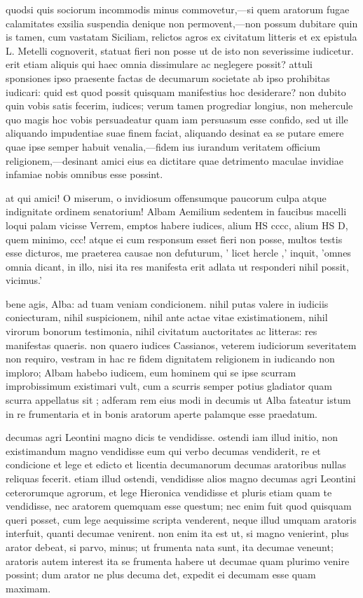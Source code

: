  quodsi quis sociorum incommodis minus commovetur,—si quem aratorum fugae calamitates exsilia suspendia denique non permovent,—non possum dubitare quin is tamen, cum vastatam Siciliam, relictos agros ex civitatum litteris et ex epistula L. Metelli cognoverit, statuat fieri non posse ut de isto non severissime iudicetur. erit etiam aliquis qui haec omnia dissimulare ac neglegere possit? attuli sponsiones ipso praesente factas de decumarum societate ab ipso prohibitas iudicari: quid est quod possit quisquam manifestius hoc desiderare? non dubito quin vobis satis fecerim, iudices; verum tamen progrediar longius, non mehercule quo magis hoc vobis persuadeatur quam iam persuasum esse confido, sed ut ille aliquando impudentiae suae finem faciat, aliquando desinat ea se putare emere quae ipse semper habuit venalia,—fidem ius iurandum veritatem officium religionem,—desinant amici eius ea dictitare quae detrimento maculae invidiae infamiae nobis omnibus esse possint.

 at qui amici! O miserum, o invidiosum offensumque paucorum culpa atque indignitate ordinem senatorium! Albam Aemilium sedentem in faucibus macelli loqui palam vicisse Verrem, emptos habere iudices, alium HS cccc, alium HS D, quem minimo, ccc! atque ei cum responsum esset fieri non posse, multos testis esse dicturos, me praeterea causae non defuturum, ' licet hercle ,' inquit, 'omnes omnia dicant, in illo, nisi ita res manifesta erit adlata ut responderi nihil possit, vicimus.'

 bene agis, Alba: ad tuam veniam condicionem. nihil putas valere in iudiciis coniecturam, nihil suspicionem, nihil ante actae vitae existimationem, nihil virorum bonorum testimonia, nihil civitatum auctoritates ac litteras: res manifestas quaeris. non quaero iudices Cassianos, veterem iudiciorum severitatem non requiro, vestram in hac re fidem dignitatem religionem in iudicando non imploro; Albam habebo iudicem, eum hominem qui se ipse scurram improbissimum existimari vult, cum a scurris semper potius gladiator quam scurra appellatus sit ; adferam rem eius modi in decumis ut Alba fateatur istum in re frumentaria et in bonis aratorum aperte palamque esse praedatum.

 decumas agri Leontini magno dicis te vendidisse. ostendi iam illud initio, non existimandum magno vendidisse eum qui verbo decumas vendiderit, re et condicione et lege et edicto et licentia decumanorum decumas aratoribus nullas reliquas fecerit. etiam illud ostendi, vendidisse alios magno decumas agri Leontini ceterorumque agrorum, et lege Hieronica vendidisse et pluris etiam quam te vendidisse, nec aratorem quemquam esse questum; nec enim fuit quod quisquam queri posset, cum lege aequissime scripta venderent, neque illud umquam aratoris interfuit, quanti decumae venirent. non enim ita est ut, si magno venierint, plus arator debeat, si parvo, minus; ut frumenta nata sunt, ita decumae veneunt; aratoris autem interest ita se frumenta habere ut decumae quam plurimo venire possint; dum arator ne plus decuma det, expedit ei decumam esse quam maximam.

